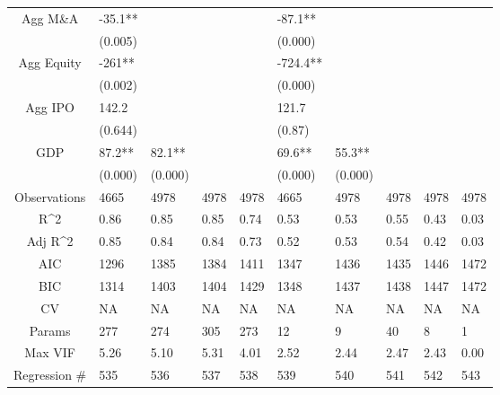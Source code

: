 \documentclass{article}
\begin{document}
\begin{table}[H]
\begin{tabular}{|clllllllll|}
  Agg M\&A & -35.1** &  &  &  & -87.1** &  &  &  &  \\
   & (0.005) &  &  &  & (0.000) &  &  &  &  \\
  Agg Equity & -261** &  &  &  & -724.4** &  &  &  &  \\
   & (0.002) &  &  &  & (0.000) &  &  &  &  \\
  Agg IPO & 142.2 &  &  &  & 121.7 &  &  &  &  \\
   & (0.644) &  &  &  & (0.87) &  &  &  &  \\
  GDP & 87.2** & 82.1** &  &  & 69.6** & 55.3** &  &  &  \\
   & (0.000) & (0.000) &  &  & (0.000) & (0.000) &  &  &  \\
  \hline
 Observations & 4665 & 4978 & 4978 & 4978 & 4665 & 4978 & 4978 & 4978 & 4978 \\
  R^2 & 0.86 & 0.85 & 0.85 & 0.74 & 0.53 & 0.53 & 0.55 & 0.43 & 0.03 \\
  Adj R^2 & 0.85 & 0.84 & 0.84 & 0.73 & 0.52 & 0.53 & 0.54 & 0.42 & 0.03 \\
  AIC & 1296 & 1385 & 1384 & 1411 & 1347 & 1436 & 1435 & 1446 & 1472 \\
  BIC & 1314 & 1403 & 1404 & 1429 & 1348 & 1437 & 1438 & 1447 & 1472 \\
  CV & NA & NA & NA & NA & NA & NA & NA & NA & NA \\
  Params & 277 & 274 & 305 & 273 & 12 & 9 & 40 & 8 & 1 \\
  Max VIF & 5.26 & 5.10 & 5.31 & 4.01 & 2.52 & 2.44 & 2.47 & 2.43 & 0.00 \\
  Regression \# & 535 & 536 & 537 & 538 & 539 & 540 & 541 & 542 & 543 \\
   \hline
\end{tabular}

\end{table}
\end{document}
